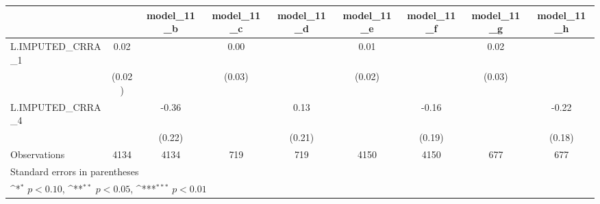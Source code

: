 {
\def\sym#1{\ifmmode^{#1}\else\(^{#1}\)\fi}
\begin{tabular}{l*{8}{c}}
\toprule
                &\multicolumn{1}{c}{}&\multicolumn{1}{c}{model\_11\_b}&\multicolumn{1}{c}{model\_11\_c}&\multicolumn{1}{c}{model\_11\_d}&\multicolumn{1}{c}{model\_11\_e}&\multicolumn{1}{c}{model\_11\_f}&\multicolumn{1}{c}{model\_11\_g}&\multicolumn{1}{c}{model\_11\_h}\\
\midrule
L.IMPUTED\_CRRA\_1&     0.02         &                  &     0.00         &                  &     0.01         &                  &     0.02         &                  \\
                &   (0.02)         &                  &   (0.03)         &                  &   (0.02)         &                  &   (0.03)         &                  \\
\addlinespace
L.IMPUTED\_CRRA\_4&                  &    -0.36         &                  &     0.13         &                  &    -0.16         &                  &    -0.22         \\
                &                  &   (0.22)         &                  &   (0.21)         &                  &   (0.19)         &                  &   (0.18)         \\
\midrule
Observations    &     4134         &     4134         &      719         &      719         &     4150         &     4150         &      677         &      677         \\
\bottomrule
\multicolumn{9}{l}{\footnotesize Standard errors in parentheses}\\
\multicolumn{9}{l}{\footnotesize \sym{*} \(p<0.10\), \sym{**} \(p<0.05\), \sym{***} \(p<0.01\)}\\
\end{tabular}
}
